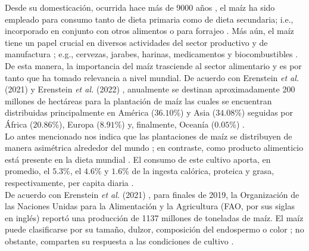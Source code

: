 Desde su domesticación, ocurrida hace más de 9000 años \cite{Park_2025, Yang_2023}, el maíz ha sido empleado para consumo tanto de dieta primaria como de dieta secundaria; i.e., incorporado en conjunto con otros alimentos o para forrajeo \cite{Revilla_2022}. Más aún, el maíz tiene un papel crucial en diversos actividades del sector productivo y de manufactura \cite{Ranum_2014}; e.g., cervezas, jarabes, harinas, medicamentos y biocombustibles \cite{Rausch_2006,SOKANADEAGA_2024, Zhang_2022}.\\



De esta manera, la importancia del maíz trasciende al sector alimentario y es por tanto que ha tomado relevancia a nivel mundial. De acuerdo con Erenstein \textit{et al.} (2021) \cite{ERENSTEIN_2021} y Erenstein \textit{et al.} (2022)  \cite{Erenstein_2022}, anualmente se destinan aproximadamente 200 millones de hectáreas para la plantación de maíz las cuales se encuentran distribuidas principalmente en América ($36.10\%$) y Asia ($34.08\%$) seguidas por África ($20.86\%$), Europa ($8.91\%$) y, finalmente, Oceanía ($0.05\%$) \cite{Erenstein_2022}.\\


Lo antes mencionado nos indica que las plantaciones de maíz se distribuyen de manera asimétrica alrededor del mundo \cite{Ranum_2014}; en contraste, como producto alimenticio está presente en la dieta mundial \cite{Erenstein_2022}. El consumo de este cultivo aporta, en promedio, el $5.3\%$, el $4.6\%$ y $1.6\%$ de la ingesta calórica, proteica y grasa, respectivamente, per capita diaria \cite{Erenstein_2022}.\\


De acuerdo con Erenstein \textit{et al.} (2021) \cite{ERENSTEIN_2021}, para finales de 2019, la Organización de las Naciones Unidas para la Alimentación y la Agricultura (FAO, por sus siglas en inglés) reportó una producción de 1137 millones de toneladas de maíz. El maíz puede clasificarse por su tamaño, dulzor, composición del endospermo o color \cite{Ranum_2014}; no obstante, comparten su respuesta a las condiciones de cultivo \cite{Sanchez_2014, Parent_2012}.\\


